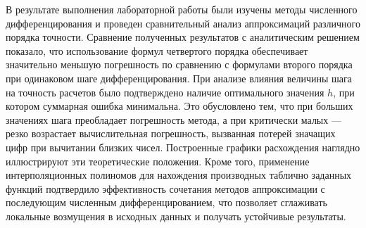 \documentclass[a4paper]{article}
\begin{document}
В результате выполнения лабораторной работы были изучены методы численного дифференцирования и проведен сравнительный анализ аппроксимаций различного порядка точности. Сравнение полученных результатов с аналитическим решением показало, что использование формул четвертого порядка обеспечивает значительно меньшую погрешность по сравнению с формулами второго порядка при одинаковом шаге дифференцирования. При анализе влияния величины шага на точность расчетов было подтверждено наличие оптимального значения $h$, при котором суммарная ошибка минимальна. Это обусловлено тем, что при больших значениях шага преобладает погрешность метода, а при критически малых — резко возрастает вычислительная погрешность, вызванная потерей значащих цифр при вычитании близких чисел. Построенные графики расхождения наглядно иллюстрируют эти теоретические положения. Кроме того, применение интерполяционных полиномов для нахождения производных таблично заданных функций подтвердило эффективность сочетания методов аппроксимации с последующим численным дифференцированием, что позволяет сглаживать локальные возмущения в исходных данных и получать устойчивые результаты.
\end{document}

